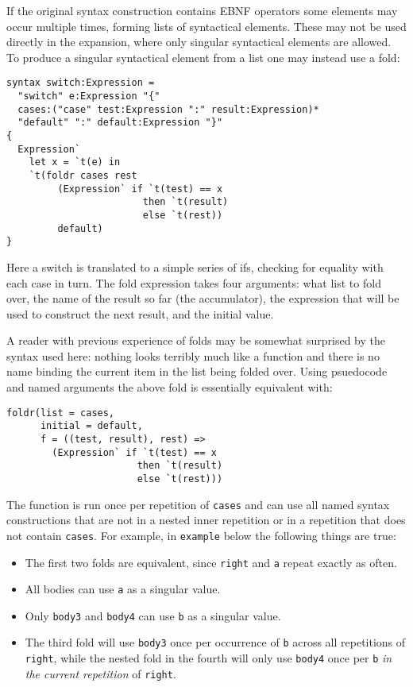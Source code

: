 \documentclass{kththesis}
\begin{document}
If the original syntax construction contains EBNF operators some elements may occur multiple times, forming lists of syntactical elements. These may not be used directly in the expansion, where only singular syntactical elements are allowed. To produce a singular syntactical element from a list one may instead use a fold:

\begin{verbatim}
syntax switch:Expression =
  "switch" e:Expression "{"
  cases:("case" test:Expression ":" result:Expression)*
  "default" ":" default:Expression "}"
{
  Expression`
    let x = `t(e) in
    `t(foldr cases rest
         (Expression` if `t(test) == x
                        then `t(result)
                        else `t(rest))
         default)
}
\end{verbatim}

Here a switch is translated to a simple series of ifs, checking for equality with each case in turn. The fold expression takes four arguments: what list to fold over, the name of the result so far (the accumulator), the expression that will be used to construct the next result, and the initial value.

A reader with previous experience of folds may be somewhat surprised by the syntax used here: nothing looks terribly much like a function and there is no name binding the current item in the list being folded over. Using psuedocode and named arguments the above fold is essentially equivalent with:

\begin{verbatim}
foldr(list = cases,
      initial = default,
      f = ((test, result), rest) =>
        (Expression` if `t(test) == x
                       then `t(result)
                       else `t(rest)))
\end{verbatim}

The function is run once per repetition of \texttt{cases} and can use all named syntax constructions that are not in a nested inner repetition or in a repetition that does not contain \texttt{cases}. For example, in \texttt{example} below the following things are true:
\begin{itemize}
  \item The first two folds are equivalent, since \texttt{right} and \texttt{a} repeat exactly as often.
  \item All bodies can use \texttt{a} as a singular value.
  \item Only \texttt{body3} and \texttt{body4} can use \texttt{b} as a singular value.
  \item The third fold will use \texttt{body3} once per occurrence of \texttt{b} across all repetitions of \texttt{right}, while the nested fold in the fourth will only use \texttt{body4} once per \texttt{b} \emph{in the current repetition} of \texttt{right}.
\end{itemize}
\end{document}
